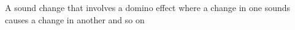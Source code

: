 A sound change that involves a domino effect where a change in one sounds causes a change in another and so on
